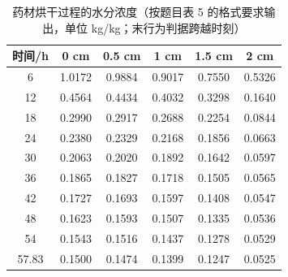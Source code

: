 \begin{table}[H]
\centering
\caption{药材烘干过程的水分浓度（按题目表 5 的格式要求输出，单位 kg/kg；末行为判据跨越时刻）}
\label{tab:q3}
\begin{tabular}{c|ccccc}
\toprule
时间/h & 0 cm & 0.5 cm & 1 cm & 1.5 cm & 2 cm \\
\midrule
6 & 1.0172 & 0.9884 & 0.9017 & 0.7550 & 0.5326 \\
12 & 0.4564 & 0.4434 & 0.4032 & 0.3298 & 0.1640 \\
18 & 0.2990 & 0.2917 & 0.2688 & 0.2254 & 0.0844 \\
24 & 0.2380 & 0.2329 & 0.2168 & 0.1856 & 0.0663 \\
30 & 0.2063 & 0.2020 & 0.1892 & 0.1642 & 0.0597 \\
36 & 0.1865 & 0.1827 & 0.1718 & 0.1505 & 0.0565 \\
42 & 0.1727 & 0.1693 & 0.1597 & 0.1408 & 0.0547 \\
48 & 0.1623 & 0.1593 & 0.1507 & 0.1335 & 0.0536 \\
54 & 0.1543 & 0.1516 & 0.1437 & 0.1278 & 0.0529 \\
57.83 & 0.1500 & 0.1474 & 0.1399 & 0.1247 & 0.0525 \\
\bottomrule
\end{tabular}
\end{table}
